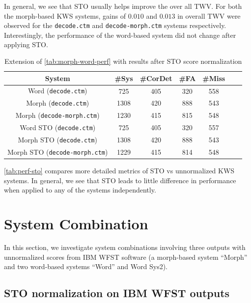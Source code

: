 \documentclass[a4paper,oneside,reqno]{amsart}
\begin{document}
In general, we see that STO usually helps improve the over all TWV\@. For
both the morph-based KWS systems, gains of $0.010$ and $0.013$ in overall
TWV were observed for the \texttt{decode.ctm} and \texttt{decode-morph.ctm}
systems respectively. Interestingly, the performance of the word-based
system did not change after applying STO.

\begin{table}
  \begin{tabular}{ccccccc}
    \toprule
    System                                & \#Sys & \#CorDet & \#FA & \#Miss \\
    \midrule
    Word (\texttt{decode.ctm})            & 725   & 405      & 320  & 558\\
    Morph (\texttt{decode.ctm})           & 1308  & 420      & 888  & 543\\
    Morph (\texttt{decode-morph.ctm})     & 1230  & 415      & 815  & 548\\
    \hline
    Word STO (\texttt{decode.ctm})        & 725   & 405      & 320  & 557\\
    Morph STO (\texttt{decode.ctm})       & 1308  & 420      & 888  & 543\\
    Morph STO (\texttt{decode-morph.ctm}) & 1229  & 415      & 814  & 548\\
    \bottomrule
  \end{tabular}
  \caption{Extension of \autoref{tab:morph-word-perf} with results after STO score normalization}
  \label{tab:perf-sto}
\end{table}

\autoref{tab:perf-sto} compares more detailed metrics of STO vs unnormalized KWS systems. In
general, we see that STO leads to little difference in performance when applied to any of the
systems independently.

\section{System Combination}

In this section, we investigate system combinations involving three outputs
with unnormalized scores from IBM WFST software (a morph-based system ``Morph''
and two word-based systems ``Word'' and Word Sys2).

\subsection{STO normalization on IBM WFST outputs}
\end{document}
